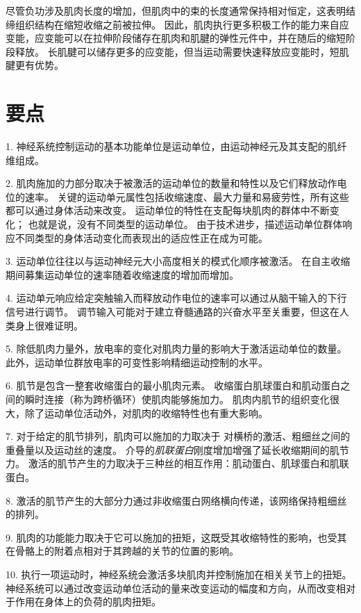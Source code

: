 尽管负功涉及肌肉长度的增加，但肌肉中的束的长度通常保持相对恒定，这表明结缔组织结构在缩短收缩之前被拉伸。
因此，肌肉执行更多积极工作的能力来自应变能，应变能可以在拉伸阶段储存在肌肉和肌腱的弹性元件中，并在随后的缩短阶段释放。
长肌腱可以储存更多的应变能，但当运动需要快速释放应变能时，短肌腱更有优势。



\section{要点}

1. 神经系统控制运动的基本功能单位是运动单位，由运动神经元及其支配的肌纤维组成。 


2. 肌肉施加的力部分取决于被激活的运动单位的数量和特性以及它们释放动作电位的速率。
关键的运动单元属性包括收缩速度、最大力量和易疲劳性，所有这些都可以通过身体活动来改变。
运动单位的特性在支配每块肌肉的群体中不断变化；
也就是说，没有不同类型的运动单位。
由于技术进步，描述运动单位群体响应不同类型的身体活动变化而表现出的适应性正在成为可能。


3. 运动单位往往以与运动神经元大小高度相关的模式化顺序被激活。
在自主收缩期间募集运动单位的速率随着收缩速度的增加而增加。


4. 运动单元响应给定突触输入而释放动作电位的速率可以通过从脑干输入的下行信号进行调节。
调节输入可能对于建立脊髓通路的兴奋水平至关重要，但这在人类身上很难证明。


5. 除低肌肉力量外，放电率的变化对肌肉力量的影响大于激活运动单位的数量。
此外，运动单位群放电率的可变性影响精细运动控制的水平。


6. 肌节是包含一整套收缩蛋白的最小肌肉元素。
收缩蛋白肌球蛋白和肌动蛋白之间的瞬时连接（称为跨桥循环）使肌肉能够施加力。
肌肉内肌节的组织变化很大，除了运动单位活动外，对肌肉的收缩特性也有重大影响。


7. 对于给定的肌节排列，肌肉可以施加的力取决于  对横桥的激活、粗细丝之间的重叠量以及运动丝的速度。
 介导的\textit{肌联蛋白}刚度增加增强了延长收缩期间的肌节力。
激活的肌节产生的力取决于三种丝的相互作用：肌动蛋白、肌球蛋白和肌联蛋白。


8. 激活的肌节产生的大部分力通过非收缩蛋白网络横向传递，该网络保持粗细丝的排列。


9. 肌肉的功能能力取决于它可以施加的扭矩，这既受其收缩特性的影响，也受其在骨骼上的附着点相对于其跨越的关节的位置的影响。


10. 执行一项运动时，神经系统会激活多块肌肉并控制施加在相关关节上的扭矩。
神经系统可以通过改变运动单位活动的量来改变运动的幅度和方向，从而改变相对于作用在身体上的负荷的肌肉扭矩。


